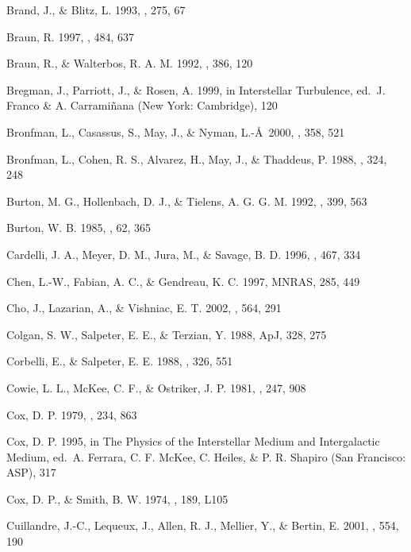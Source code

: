 \documentclass[12pt,preprint,flushrt]{aastex}
\begin{document}
\begin{thebibliography}{}
Brand, J., \& Blitz, L. 1993, \aap,
275, 67

Braun, R. 1997, \apj, 484, 637

Braun, R., \& Walterbos,
R. A. M. 1992, \apj, 386, 120

Bregman, J., Parriott, J., \&
Rosen, A. 1999, in Interstellar Turbulence, ed.\ J. Franco \&
A. Carrami\~nana (New York: Cambridge),  120

Bronfman, L., Casassus, S.,
May, J., \& Nyman, L.-\AA\ 2000, \aap, 358, 521

Bronfman, L., Cohen, R. S.,
Alvarez, H., May, J., \& Thaddeus, P. 1988, \apj, 324, 248

Burton, M. G., 
Hollenbach, D. J., \& Tielens, A. G. G. M. 1992, \apj, 399, 563

Burton, W. B. 1985, \aaps, 62, 365

Cardelli, J. A., Meyer, D. M.,
Jura, M., \& Savage, B. D. 1996, \apj, 467, 334

Chen, L.-W., Fabian,
A. C., \& Gendreau, K. C. 1997, MNRAS, 285, 449

Cho, J., Lazarian, A., 
    \& Vishniac, E. T. 2002, \apj, 564, 291

Colgan, S. W., Salpeter,
E. E., \& Terzian, Y. 1988, ApJ, 328, 275

Corbelli, E., \& Salpeter, E. E. 1988, \apj, 326, 551

Cowie, L. L., McKee, C. F., 
\& Ostriker, J. P. 1981, \apj, 247, 908

Cox, D. P. 1979, \apj, 234, 863

Cox, D. P. 1995, in The Physics of the Interstellar
Medium and Intergalactic Medium, ed.\ A. Ferrara, C. F. McKee, C. Heiles,
\& P. R. Shapiro (San Francisco: ASP), 317

Cox, D. P., \& Smith, B. W. 1974, \apj, 189, L105

Cuillandre, J.-C., Lequeux, J.,
Allen, R. J., Mellier, Y., \& Bertin, E. 2001, \apj, 554, 190


\end{thebibliography}
\end{document}
